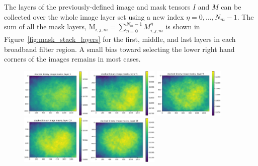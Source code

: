 \documentclass[letterpaper,11pt]{article}
\newcommand{\reffig}[1]{Figure~\ref{#1}}
\newcommand{\Mu}{\mathrm{M}}
\begin{document}
The layers of the previously-defined image and mask tensors $I$ and $M$ can be collected over the whole image layer set using a new index $\eta=0,\ldots,N_{m}-1$. The sum of all the mask layers, $\Mu_{i,j,m} = \sum_{\eta=0}^{N_{m}-1} M^{\eta}_{i,j,m}$ is shown in \reffig{fig:mask_stack_layers} for the first, middle, and last layers in each broadband filter region. A small bias toward selecting the lower right hand corners of the images remains in most cases. 

\begin{figure}[!ht]
\centering
\includegraphics[width=0.3\textwidth]{images/measuring_flatfield_corrections/mask_stack_layers/mask_stack_layer_1}
\includegraphics[width=0.3\textwidth]{images/measuring_flatfield_corrections/mask_stack_layers/mask_stack_layer_5}
\includegraphics[width=0.3\textwidth]{images/measuring_flatfield_corrections/mask_stack_layers/mask_stack_layer_9}
\includegraphics[width=0.3\textwidth]{images/measuring_flatfield_corrections/mask_stack_layers/mask_stack_layer_10}
\includegraphics[width=0.3\textwidth]{images/measuring_flatfield_corrections/mask_stack_layers/mask_stack_layer_14}

\end{figure}
\end{document}

